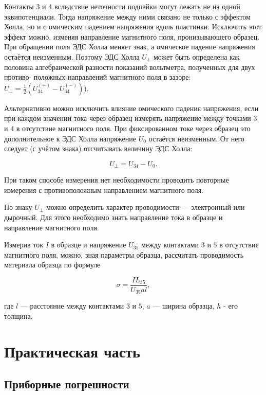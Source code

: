 \documentclass[a4paper,12pt]{article} %
\begin{document}
Контакты 3 и 4 вследствие неточности подпайки могут лежать не на одной эквипотенциали. Тогда напряжение между ними связано не только с эффектом Холла, но и с омическим падением напряжения вдоль пластинки. Исключить этот эффект можно, изменяя направление магнитного поля, пронизывающего образец. При обращении поля ЭДС Холла меняет знак, а омическое падение напряжения остаётся неизменным. Поэтому ЭДС Холла $U_{\perp}$ может быть определена как половина алгебраической разности показаний вольтметра, полученных для двух противо-
положных направлений магнитного поля в зазоре: $U_{\perp} = \frac{1}{2}(U_{34}^{(+)} - U_{34}^{(-)})$).\par

Альтернативно можно исключить влияние омического падения напряжения, если при каждом значении тока через образец измерять напряжение между точками $3$ и $4$ в отсутствие магнитного поля. При фиксированном токе через образец это дополнительное к ЭДС Холла напряжение $U_0$ остаётся неизменным. От него следует (с учётом знака) отсчитывать величину ЭДС Холла:\par

\[ U_{\perp} = U_{34} - U_0. \]

При таком способе измерения нет необходимости проводить повторные измерения с противоположным направлением магнитного поля.\par

По знаку $U_{\perp}$ можно определить характер проводимости — электронный или дырочный. Для этого необходимо знать направление тока в образце и направление магнитного поля.\par

Измерив ток $I$ в образце и напряжение $U_{35}$ между контактами $3$ и $5$ в отсутствие магнитного поля, можно, зная параметры образца, рассчитать проводимость материала образца по формуле

\begin{equation}\label{1}
\sigma = \frac{IL_{35}}{U_{35}al},
\end{equation}

где $l$ — расстояние между контактами $3$ и $5$, $a$ — ширина образца, $h$ - его толщина.

\newpage
\section{Практическая часть}

\subsection{Приборные погрешности}
\end{document}
